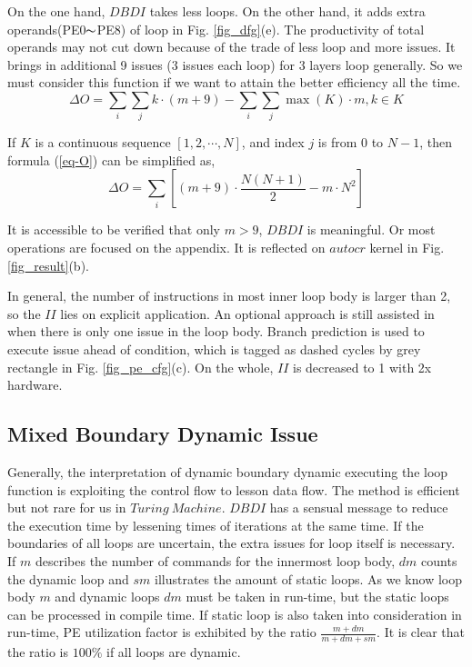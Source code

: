 \documentclass[10pt, conference, compsocconf]{IEEEtran}
\begin{document}
 On the one hand, $DBDI$ takes less loops. On the other hand, it adds extra operands(PE0$\thicksim$PE8) of loop in Fig. \ref{fig_dfg}(e). The productivity of total operands may not cut down because of the trade of less loop and more issues. It brings in additional 9 issues (3 issues each loop) for 3 layers loop generally. So we must consider this function if we want to attain the better efficiency all the time.
 \begin{equation}\label{eq-O}
 \Delta{O}=\sum_{i}\sum_{j}k\cdot{(m+9)} - \sum_{i}\sum_{j}\max{(K)}\cdot{m}, k \in K
 \end{equation}


 If $K$ is a continuous sequence $[1,2,\cdots,N]$, and index $j$ is from $0$ to $N-1$, then formula (\ref{eq-O}) can be simplified as,
 \begin{equation}\label{eq-OS}
 \Delta{O}=\sum_{i}[(m+9)\cdot{\frac{N(N+1)}{2}} - m \cdot{N^2} ]
 \end{equation}

 It is accessible to be verified that only $m>9$, $DBDI$ is meaningful. Or most operations are focused on the appendix. It is reflected on $autocr$ kernel in Fig. \ref{fig_result}(b).

In general, the number of instructions in most inner loop body is larger than 2, so the $II$ lies on explicit application. An optional approach is still assisted in when there is only one issue in the loop body. Branch prediction \cite{mo-wang2015acceleration,dbdi-mahlke1996compiler} is used to execute issue ahead of condition, which is tagged as dashed cycles by grey rectangle in Fig. \ref{fig_pe_cfg}(c). On the whole, $II$ is decreased to 1 with 2x hardware.
\subsection{Mixed Boundary Dynamic Issue}
Generally, the interpretation of dynamic boundary dynamic executing the loop function is exploiting the control flow to lesson data flow. The method is efficient but not rare for us in $Turing\ Machine$. $DBDI$ has a sensual message to reduce the execution time by lessening times of iterations at the same time. If the boundaries of all loops are uncertain, the extra issues for loop itself is necessary. If $m$ describes the number of commands for the innermost loop body, $dm$ counts the dynamic loop and $sm$ illustrates the amount of static loops. As we know loop body $m$ and dynamic loops $dm$ must be taken in run-time, but the static loops can be processed in compile time. If static loop is also taken into consideration in run-time, PE utilization factor is exhibited by the ratio $\frac{m+dm}{m+dm+sm}$. It is clear that the ratio is $100\%$ if all loops are dynamic.
\end{document}
